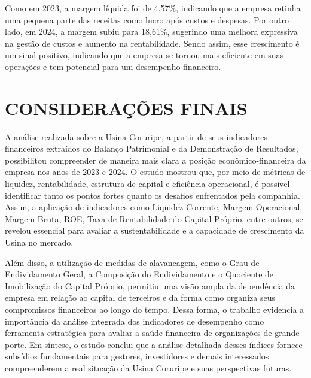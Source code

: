 \documentclass[1pt,a4paper]{article}
\begin{document}
	Como em 2023, a margem líquida foi de 4,57\%, indicando que a empresa retinha uma pequena parte das receitas como lucro após custos e despesas. Por outro lado, em 2024, a margem subiu para 18,61\%, sugerindo uma melhora expressiva na gestão de custos e aumento na rentabilidade. Sendo assim, esse crescimento é um sinal positivo, indicando que a empresa se tornou mais eficiente em suas operações e tem potencial para um desempenho financeiro.
	
	
	
	\section{CONSIDERAÇÕES FINAIS}
	
	\hspace*{1.5cm}A análise realizada sobre a Usina Coruripe, a partir de seus indicadores financeiros extraídos do Balanço Patrimonial e da Demonstração de Resultados, possibilitou compreender de maneira mais clara a posição econômico-financeira da empresa nos anos de 2023 e 2024. O estudo mostrou que, por meio de métricas de liquidez, rentabilidade, estrutura de capital e eficiência operacional, é possível identificar tanto os pontos fortes quanto os desafios enfrentados pela companhia. Assim, a aplicação de indicadores como Liquidez Corrente, Margem Operacional, Margem Bruta, ROE, Taxa de Rentabilidade do Capital Próprio, entre outros, se revelou essencial para avaliar a sustentabilidade e a capacidade de crescimento da Usina no mercado.
	
	Além disso, a utilização de medidas de alavancagem, como o Grau de Endividamento Geral, a Composição do Endividamento e o Quociente de Imobilização do Capital Próprio, permitiu uma visão ampla da dependência da empresa em relação ao capital de terceiros e da forma como organiza seus compromissos financeiros ao longo do tempo. Dessa forma, o trabalho evidencia a importância da análise integrada dos indicadores de desempenho como ferramenta estratégica para avaliar a saúde financeira de organizações de grande porte. Em síntese, o estudo conclui que a análise detalhada desses índices fornece subsídios fundamentais para gestores, investidores e demais interessados compreenderem a real situação da Usina Coruripe e suas perspectivas futuras.
	
	\newpage
	
\end{document}
